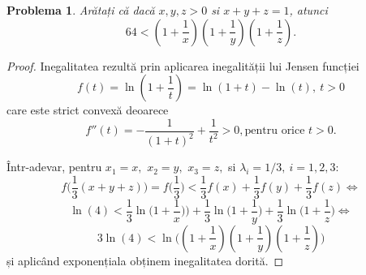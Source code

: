 \documentclass[a4paper,12pt,oneside]{report}
\newtheorem{problem}{Problema}
\begin{document}
\begin{problem}
Arătați că dacă \(x , y , z > 0\) si \(x+ y + z = 1\), atunci
\begin{displaymath}
  64 < \left ( 1 + \frac{1}{x} \right )\left ( 1 + \frac{1}{y} \right )\left ( 1 + \frac{1}{z} \right ).
\end{displaymath}
\end{problem}
\begin{proof}
Inegalitatea rezultă prin aplicarea inegalității lui Jensen funcției
\begin{displaymath}
  f\left ( t \right ) = \ln \left ( 1+\frac{1}{t} \right ) = \ln \left ( 1 + t \right ) - \ln \left ( t \right ),~t>0
\end{displaymath}
care este strict convexă deoarece
\begin{displaymath}
  {f}''\left ( t \right ) = -\frac{1}{\left ( 1 + t \right )^{2}} + \frac{1}{t^{2}} > 0,  \text{pentru orice } t > 0.
\end{displaymath}

Într-adevar, pentru  $x_1=x,$ $x_2=y,$ $x_3=z,$ si $\lambda_i=1/3,~i=1, 2, 3:$
\[
f\biggl(\frac{1}{3}(x+y+z)\biggr)=f\biggl(\frac{1}{3}\biggr)<\frac{1}{3}f(x)+\frac{1}{3}f(y)+\frac{1}{3}f(z)\Leftrightarrow
\]
\[
\ln (4)<\frac{1}{3}\ln\biggl(1+\frac{1}{x})\biggr) +\frac{1}{3}\ln\biggl(1+\frac{1}{y}\biggr)+\frac{1}{3}\ln\biggl(1+\frac{1}{z}\biggr)\Leftrightarrow
\]
\[
3\ln (4)< \ln\biggl((1+\frac{1}{x})(1+\frac{1}{y})(1+\frac{1}{z})\biggr)
\]
și aplicând exponențiala obținem inegalitatea dorită.
\end{proof}
\end{document}
